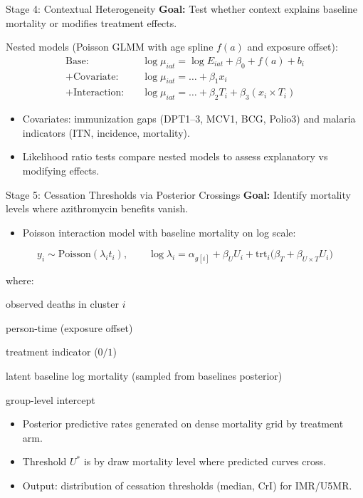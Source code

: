 \documentclass[aspectratio=169]{beamer}\usepackage[]{graphicx}\usepackage[dvipsnames]{xcolor}
\begin{document}
\begin{frame}{Stage 4: Contextual Heterogeneity}
\textbf{Goal:} Test whether context explains baseline mortality or modifies treatment effects.

Nested models (Poisson GLMM with age spline $f(a)$ and exposure offset):
\begin{align*}
  \text{Base:} &\quad \log \mu_{iat} = \log E_{iat} + \beta_0 + f(a) + b_i \\
  \text{+Covariate:} &\quad \log \mu_{iat} = \ldots + \beta_1 x_i \\
  \text{+Interaction:} &\quad \log \mu_{iat} = \ldots + \beta_2 T_i + \beta_3 (x_i \times T_i)
\end{align*}

\begin{itemize}
  \item Covariates: immunization gaps (DPT1–3, MCV1, BCG, Polio3) and malaria indicators (ITN, incidence, mortality).
  \item Likelihood ratio tests compare nested models to assess explanatory vs modifying effects.
\end{itemize}
\end{frame}

\begin{frame}{Stage 5: Cessation Thresholds via Posterior Crossings}
\textbf{Goal:} Identify mortality levels where azithromycin benefits vanish.

\begin{itemize}
  \item Poisson interaction model with baseline mortality on log scale:
\end{itemize}

\[
y_i \sim \text{Poisson}(\lambda_i t_i), \qquad
\log \lambda_i = \alpha_{g[i]} + \beta_U U_i + \text{trt}_i\big(\beta_T + \beta_{U\times T} U_i\big)
\]

\noindent where:
\begin{description}[leftmargin=1.5em]
  \item[$y_i$] observed deaths in cluster $i$
  \item[$t_i$] person-time (exposure offset)
  \item[$\text{trt}_i$] treatment indicator ($0/1$)
  \item[$U_i$] latent baseline log mortality (sampled from baselines posterior)
  \item[$\alpha_{g[i]}$] group-level intercept
\end{description}

\begin{itemize}
  \item Posterior predictive rates generated on dense mortality grid by treatment arm.
  \item Threshold $U^*$ is by draw mortality level where predicted curves cross.
  \item Output: distribution of cessation thresholds (median, CrI) for IMR/U5MR.
\end{itemize}
\end{frame}
\end{document}

